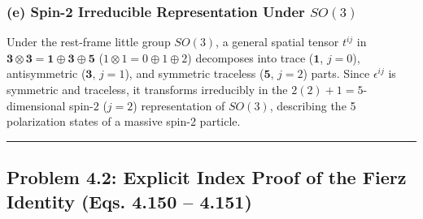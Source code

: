 \documentclass[11pt,a4paper]{article}
\begin{document}
\subsubsection*{(e) Spin-2 Irreducible Representation Under $SO(3)$}
Under the rest-frame little group $SO(3)$, a general spatial tensor $t^{ij}$ in $\mathbf{3} \otimes \mathbf{3} = \mathbf{1} \oplus \mathbf{3} \oplus \mathbf{5}$ ($1 \otimes 1 = 0 \oplus 1 \oplus 2$) decomposes into trace ($\mathbf{1}$, $j=0$), antisymmetric ($\mathbf{3}$, $j=1$), and symmetric traceless ($\mathbf{5}$, $j=2$) parts. Since $\epsilon^{ij}$ is symmetric and traceless, it transforms irreducibly in the $2(2)+1 = 5$-dimensional spin-$2$ ($j=2$) representation of $SO(3)$, describing the 5 polarization states of a massive spin-2 particle.

\vspace{0.5em}\hrule\vspace{1em}

\subsection{Problem 4.2: Explicit Index Proof of the Fierz Identity (Eqs. 4.150 -- 4.151)}
\end{document}
